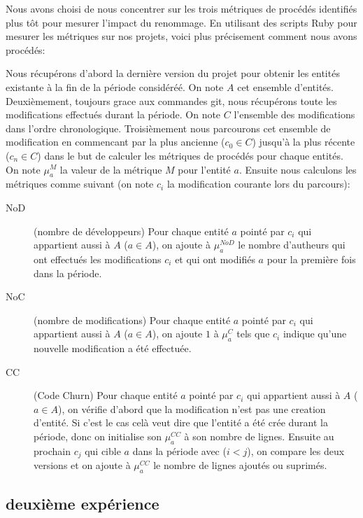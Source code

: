 Nous avons choisi de nous concentrer sur les trois métriques de procédés identifiés plus tôt pour mesurer l'impact du renommage. En utilisant des scripts Ruby pour mesurer les métriques sur nos projets, voici plus précisement comment nous avons procédés:

Nous récupérons d'abord la dernière version du projet pour obtenir les entités existante à la fin de la période considéréé. On note $A$ cet ensemble d'entités. Deuxièmement, toujours grace aux commandes git, nous récupérons toute les modifications effectués durant la période. On note $C$ l'ensemble des modifications dans l'ordre chronologique. Troisièmement nous parcourons cet ensemble de modification en commencant par la plus ancienne ($c_0 \in C$) jusqu'à la plus récente  ($c_n \in C$) dans le but de calculer les métriques de procédés pour chaque entités. On note $\mu_{a}^{M}$ la valeur de la métrique $M$ pour l'entité $a$. Ensuite nous calculons les métriques comme suivant (on note $c_i$ la modification courante lors du parcours): 

\begin{description}
	\item[NoD] (nombre de développeurs) Pour chaque entité $a$ pointé par $c_i$ qui appartient aussi à $A$ ($a \in A$), on ajoute à $\mu_{a}^{NoD}$ le nombre d'autheurs qui ont effectués les modifications $c_i$ et qui ont modifiés $a$ pour la première fois dans la période.
	\item[NoC] (nombre de modifications) Pour chaque entité $a$ pointé par $c_i$ qui appartient aussi à $A$ ($a \in A$), on ajoute $1$ à $\mu_{a}^{C}$ tels que $c_i$ indique qu'une nouvelle modification a été effectuée.
	\item[CC] (Code Churn) Pour chaque entité $a$ pointé par $c_i$ qui appartient aussi à $A$ ($a \in A$), on vérifie d'abord que la modification n'est pas une creation d'entité. Si c'est le cas celà veut dire que l'entité a été crée durant la période, donc on initialise son $\mu_{a}^{CC}$ à son nombre de lignes. Ensuite au prochain $c_j$ qui cible $a$ dans la période avec ($i < j$), on compare les deux versions et on ajoute à $\mu_{a}^{CC}$ le nombre de lignes ajoutés ou suprimés.
\end{description}


\subsection{deuxième expérience}

